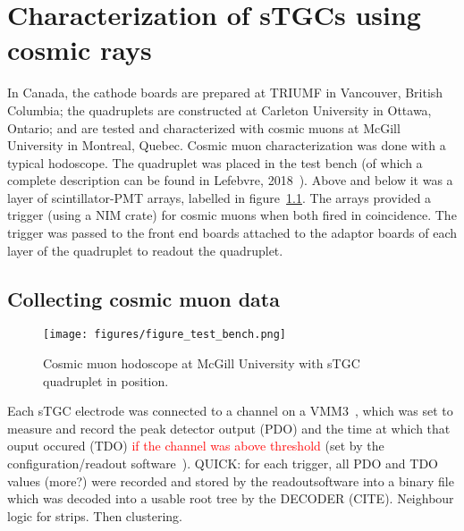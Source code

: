 
\chapter{Characterization of sTGCs using cosmic rays}
\label{chap:cosmics}

In Canada, the cathode boards are prepared at TRIUMF in Vancouver, British Columbia; the quadruplets are constructed at Carleton University in Ottawa, Ontario; and are tested and characterized with cosmic muons at McGill University in Montreal, Quebec. Cosmic muon characterization was done with a typical hodoscope.  The quadruplet was placed in the test bench (of which a complete description can be found in Lefebvre, 2018~\cite{lefebvre_thesis}). Above and below it was a layer of scintillator-PMT arrays, labelled in figure~\ref{fig:hodoscope}. The arrays provided a trigger (using a NIM crate) for cosmic muons when both fired in coincidence. The trigger was passed \iffalse through a KC705\footnote{Xilinx, Xilinx Kintex-7 FPGA KC705 Evaluation Kit, EK-K7-KC705-G, 2018} which sent it \fi to the front end boards attached to the adaptor boards of each layer of the quadruplet to readout the quadruplet. 

\section{Collecting cosmic muon data}
\begin{figure}
    \centering
    \texttt{[image: figures/figure\_test\_bench.png]}
    \caption{Cosmic muon hodoscope at McGill University with sTGC quadruplet in position.}
    \label{fig:hodoscope}
\end{figure}

Each sTGC electrode was connected to a channel on a VMM3~\cite{iakovidis_vmm3_2017}, which was set to measure and record the peak detector output (PDO) and the time at which that ouput occured (TDO) \textcolor{red}{if the channel was above threshold} (set by the configuration/readout software~\cite{siyuan_sun_stgc_readout_sw}).
QUICK: for each trigger, all PDO and TDO values (more?) were recorded and stored by the readoutsoftware into a binary file which was decoded into a usable root tree by the DECODER (CITE). Neighbour logic for strips. Then clustering.
    
